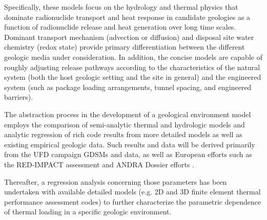 
Specifically, these models focus on the hydrology and thermal 
physics that dominate radionuclide transport and heat response in candidate 
geologies as a function of radionuclide release and heat generation over long 
time scales. Dominant transport mechanism (advection or 
diffusion) and disposal site water chemistry (redox state) provide primary 
differentiation between the different geologic media under consideration. In 
addition, the concise models are capable of roughly adjusting release 
pathways according to the characteristics of the natural system (both the host 
geologic setting and the site in general) and the engineered system (such as package 
loading arrangements, tunnel spacing, and engineered barriers).


The abstraction process in the development of a geological environment model 
employs the comparison of semi-analytic thermal and hydrologic models and 
analytic regression of rich code results from more detailed models as well as 
existing empirical geologic data. Such results and data will be derived 
primarily from the \gls{UFD} campaign \glspl{GDSM} and data, as well as European 
efforts such as the RED-IMPACT assessment and \gls{ANDRA} Dossier efforts 
\cite{von_lensa_red-impact_2008, andra_argile:_2005, clayton_generic_2011} . 


%

Thereafter, a regression analysis concerning those parameters has been undertaken 
with available detailed models (e.g. 2D and 3D finite element thermal 
performance assessment codes) to further characterize the 
parametric dependence of thermal loading in a specific geologic environment.  

